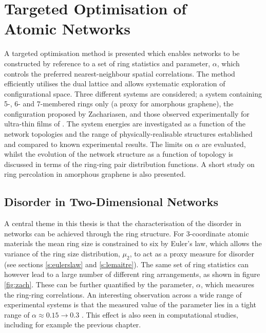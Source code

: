 \chapter[Targeted Optimisation of Atomic Networks]{Targeted Optimisation of \\ Atomic Networks}
\label{ch:targetedopt}

\begin{chapterabstract}
A targeted optimisation method is presented which enables \td{} networks to be constructed by reference to a set of ring statistics and \aw{} parameter, $\alpha$, which controls the preferred nearest\--neighbour spatial correlations.
The method efficiently utilises the dual lattice and allows systematic exploration of configurational space. 
Three different systems are considered; a system containing 5\--, 6\-- and 7\--membered rings only (a proxy for amorphous graphene), the configuration proposed by Zachariasen, and those
observed experimentally for ultra\--thin films of \sioii. 
The system energies are investigated as a function of the network topologies and the range of physically\--realisable structures established and compared to known experimental results.
The limits on $\alpha$ are evaluated, whilst the evolution of the network structure as a function of topology is discussed in terms of the ring\--ring pair distribution functions.
A short study on ring percolation in amorphous graphene is also presented.
\end{chapterabstract}


\section{Disorder in Two\--Dimensional Networks}

A central theme in this thesis is that the characterisation of the disorder in \td{} networks can be achieved through the ring structure. 
For 3\--coordinate atomic materials the mean ring size is constrained to six by Euler's law, which allows the variance of the ring size distribution, $\mu_2$, to act as a proxy measure for disorder (see sections \ref{s:eulerslaw} and \ref{s:lemaitre}).
The same set of ring statistics can however lead to a large number of different ring arrangements, as shown in figure \ref{fig:zach}.
These can be further quantified by the \aw{} parameter, $\alpha$, which measures the ring\--ring correlations.
An interesting observation across a wide range of experimental systems is that the measured value of the \aw{} parameter lies in a tight range of $\alpha\approx0.15\rightarrow 0.3$ \cite{Zsoldos1999}.
This effect is also seen in computational studies, including for example the previous chapter.


